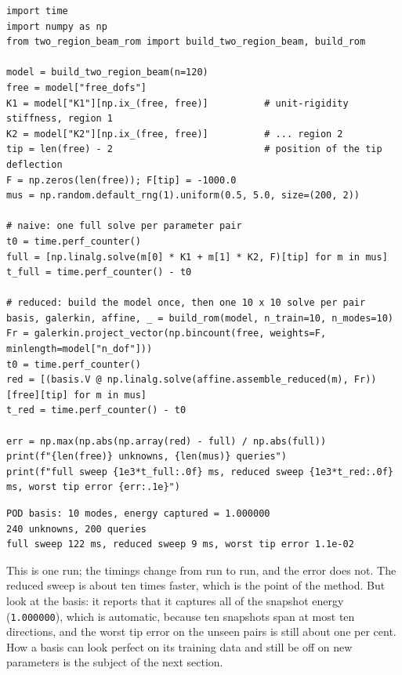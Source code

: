 \begin{lstlisting}[caption={The naive loop against the reduced sweep on the two-region beam (run from \texttt{rom\_engine/examples}).},label={lst:pod-try}]
import time
import numpy as np
from two_region_beam_rom import build_two_region_beam, build_rom

model = build_two_region_beam(n=120)
free = model["free_dofs"]
K1 = model["K1"][np.ix_(free, free)]          # unit-rigidity stiffness, region 1
K2 = model["K2"][np.ix_(free, free)]          # ... region 2
tip = len(free) - 2                           # position of the tip deflection
F = np.zeros(len(free)); F[tip] = -1000.0
mus = np.random.default_rng(1).uniform(0.5, 5.0, size=(200, 2))

# naive: one full solve per parameter pair
t0 = time.perf_counter()
full = [np.linalg.solve(m[0] * K1 + m[1] * K2, F)[tip] for m in mus]
t_full = time.perf_counter() - t0

# reduced: build the model once, then one 10 x 10 solve per pair
basis, galerkin, affine, _ = build_rom(model, n_train=10, n_modes=10)
Fr = galerkin.project_vector(np.bincount(free, weights=F, minlength=model["n_dof"]))
t0 = time.perf_counter()
red = [(basis.V @ np.linalg.solve(affine.assemble_reduced(m), Fr))[free][tip] for m in mus]
t_red = time.perf_counter() - t0

err = np.max(np.abs(np.array(red) - full) / np.abs(full))
print(f"{len(free)} unknowns, {len(mus)} queries")
print(f"full sweep {1e3*t_full:.0f} ms, reduced sweep {1e3*t_red:.0f} ms, worst tip error {err:.1e}")
\end{lstlisting}

\begin{lstlisting}[numbers=none,language={},keywordstyle={},commentstyle={},frame=single,aboveskip=2pt]
POD basis: 10 modes, energy captured = 1.000000
240 unknowns, 200 queries
full sweep 122 ms, reduced sweep 9 ms, worst tip error 1.1e-02
\end{lstlisting}

This is one run; the timings change from run to run, and the error does not. The reduced sweep is about ten times faster, which is the point of the method. But look at the basis: it reports that it captures all of the snapshot energy (\texttt{1.000000}), which is automatic, because ten snapshots span at most ten directions, and the worst tip error on the unseen pairs is still about one per cent. How a basis can look perfect on its training data and still be off on new parameters is the subject of the next section.

